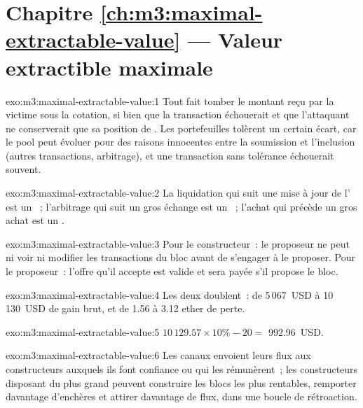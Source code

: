 \section*{Chapitre \ref{ch:m3:maximal-extractable-value} --- Valeur extractible maximale}

\begin{solution}{exo:m3:maximal-extractable-value:1}
Tout  fait tomber le montant reçu par la victime sous la cotation, si bien que la transaction échouerait et que l'attaquant ne conserverait que
sa position de . Les portefeuilles tolèrent un certain écart, car le pool peut évoluer pour des raisons innocentes entre la soumission et
l'inclusion (autres transactions, arbitrage), et une transaction sans tolérance échouerait souvent.
\end{solution}

\begin{solution}{exo:m3:maximal-extractable-value:2}
La liquidation qui suit une mise à jour de l' est un ~; l'arbitrage qui suit un gros échange est un ~; l'achat qui
précède un gros achat est un .
\end{solution}

\begin{solution}{exo:m3:maximal-extractable-value:3}
Pour le constructeur~: le proposeur ne peut ni voir ni modifier les transactions du bloc avant de s'engager à le proposer. Pour le
proposeur~: l'offre qu'il accepte est valide et sera payée s'il propose le bloc.
\end{solution}

\begin{solution}{exo:m3:maximal-extractable-value:4}
Les deux doublent~: de 5\,067~USD à 10\,130~USD de gain brut, et de 1.56 à 3.12 ether de perte.
\end{solution}

\begin{solution}{exo:m3:maximal-extractable-value:5}
$10\,129.57 \times 10\% - 20 = $ 992.96~USD.
\end{solution}

\begin{solution}{exo:m3:maximal-extractable-value:6}
Les canaux envoient leurs flux aux constructeurs auxquels ils font confiance ou qui les rémunèrent~; les constructeurs disposant du plus grand  peuvent construire les blocs les plus
rentables, remporter davantage d'enchères et attirer davantage de flux, dans une boucle de rétroaction.
\end{solution}

